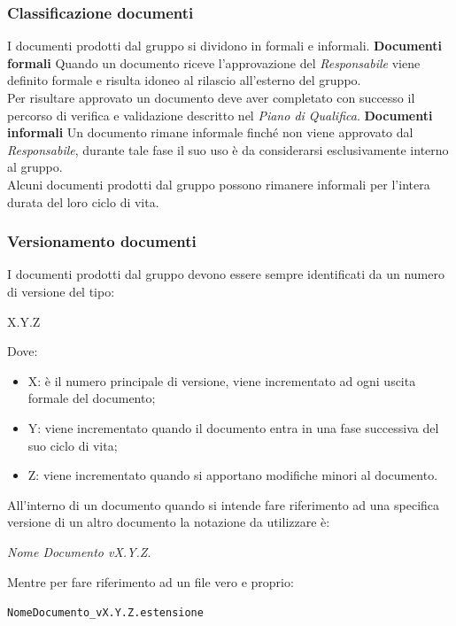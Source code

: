 \documentclass[a4paper]{article}
\begin{document}
		\subsubsection{Classificazione documenti}
		I documenti prodotti dal gruppo si dividono in formali e informali.
		\textbf{Documenti formali}
		Quando un documento riceve l'approvazione del \emph{Responsabile} viene definito formale e risulta idoneo
		al rilascio all'esterno del gruppo. \\
		Per risultare approvato un documento deve aver completato con successo il percorso di verifica e validazione
		descritto nel \emph{Piano di Qualifica}.
		\textbf{Documenti informali}
		Un documento rimane informale finché non viene approvato dal \emph{Responsabile}, durante tale fase
		il suo uso è da considerarsi esclusivamente interno al gruppo. \\
		Alcuni documenti prodotti dal gruppo possono rimanere informali per l'intera durata del loro ciclo di vita.
		\subsubsection{Versionamento documenti}
		I documenti prodotti dal gruppo devono essere sempre identificati da un numero di versione del tipo:
		\begin{center}
			X.Y.Z
		\end{center}
		Dove:
		\begin{itemize}
			\item X: è il numero principale di versione, viene incrementato ad ogni uscita formale del documento;
			\item Y: viene incrementato quando il documento entra in una fase successiva del suo ciclo di vita;
			\item Z: viene incrementato quando si apportano modifiche minori al documento.
		\end{itemize}
		All'interno di un documento quando si intende fare riferimento ad una specifica versione di un altro documento la
		notazione da utilizzare è:
		\begin{center}
			\emph{Nome Documento vX.Y.Z}.
		\end{center}
		Mentre per fare riferimento ad un file vero e proprio:
		\begin{center}
			\verb|NomeDocumento_vX.Y.Z.estensione|
		\end{center}
\end{document}
